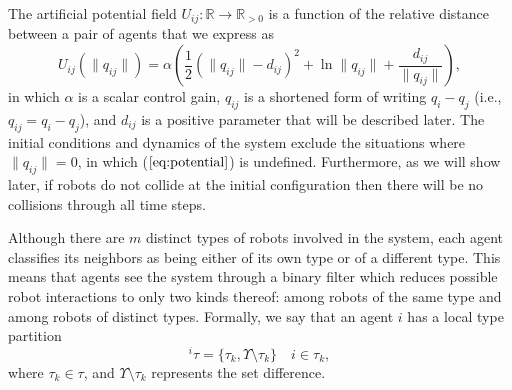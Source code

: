 \documentclass[letterpaper, 10 pt, conference]{ieeeconf}  %
\newcommand{\norm}[1]{\lVert#1\rVert}
\begin{document}
The artificial potential field $U_{ij}:\mathbb{R} \to \mathbb{R}_{>0}$
is a function of the relative distance between a pair of agents that
we express as
\begin{equation}
  \label{eq:potential}
  U_{ij}(\norm{q_{ij}}) = \alpha\left(\frac{1}{2} (\norm{q_{ij}} - d_{ij})^2 + \ln{\norm{q_{ij}}} + \frac{d_{ij}}{\norm{q_{ij}}}\right),
\end{equation}
in which $\alpha$ is a scalar control gain, $q_{ij}$ is a shortened
form of writing $q_i-q_j$ (i.e., $q_{ij}=q_i-q_j$), and $d_{ij}$ is a
positive parameter that will be described later. The initial
conditions and dynamics of the system exclude the situations where
$\norm{q_{ij}} = 0$, in which ($\ref{eq:potential}$) is
undefined. Furthermore, as we will show later, if robots do not
collide at the initial configuration then there will be no collisions
through all time steps.

Although there are $m$ distinct types of robots involved in the
system, each agent classifies its neighbors as being either of its own
type or of a different type. This means that agents see the system
through a binary filter which reduces possible robot interactions to
only two kinds thereof: among robots of the same type and among robots
of distinct types. Formally, we say that an agent $i$ has a local type
partition
\begin{equation}
  \label{eq:local_types}
  ^i\tau = \{\tau_k, \Upsilon \setminus \tau_k\} \hspace{1em} i \in \tau_k,
\end{equation}
where $\tau_k \in \tau$, and $\Upsilon \setminus \tau_k$ represents the set difference.
\end{document}
